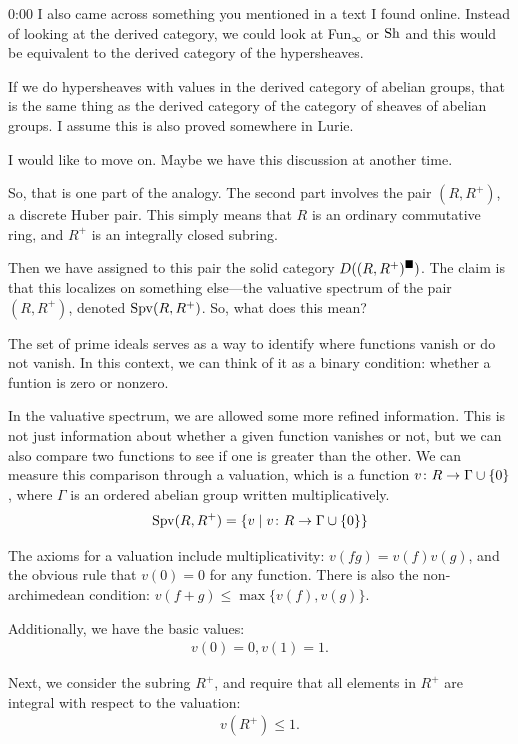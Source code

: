 \begin{unfinished}{0:00}
\ques I also came across something you mentioned in a text I found online. Instead of looking at the derived category, we could look at Fun$_\infty$ or $\operatorname{Sh}$ and this would be equivalent to the derived category of the hypersheaves. 

% 
If we do hypersheaves with values in the derived category of abelian groups, that is the same thing as the derived category of the category of sheaves of abelian groups. I assume this is also proved somewhere in Lurie. 

I would like to move on. Maybe we have this discussion at another time. 

So, that is one part of the analogy. The second part involves the pair $(R, R^+)$, a discrete Huber pair. This simply means that $R$ is an ordinary commutative ring, and $R^+$ is an integrally closed subring.

Then we have assigned to this pair the solid category $D((R,R^+)^\blacksquare)$. The claim is that this localizes on something else---the valuative spectrum of the pair $(R, R^+)$, denoted $\operatorname{Spv}(R, R^+)$. So, what does this mean?

The set of prime ideals serves as a way to identify where functions vanish or do not vanish.
In this context, we can think of it as a binary condition: whether a funtion is zero or nonzero. 

In the valuative spectrum, we are allowed some more refined information. This is not just information about whether a given function vanishes or not, but we can also compare two functions to see if one is greater than the other.
We can measure this comparison through a valuation, which is a function $v \colon R \to \Gamma \cup \{0\}$, where $\Gamma$ is an ordered abelian group written multiplicatively.
\begin{align*}
\operatorname{Spv}(R, R^+) = \{ v \mid v \colon R \to \Gamma \cup \{0\} \}
\end{align*}

The axioms for a valuation include multiplicativity: $v(fg) = v(f)v(g)$, and the obvious rule that $v(0) = 0$ for any function.
There is also the non-archimedean condition: $v(f+g) \le \max\{v(f), v(g)\}$. 

Additionally, we have the basic values:
\begin{align*}
v(0) = 0, v(1) = 1.
\end{align*}

Next, we consider the subring $R^+$, and require that all elements in $R^+$ are integral with respect to the valuation:
\begin{align*}
v(R^+) \leq 1.
\end{align*}


\end{unfinished}
